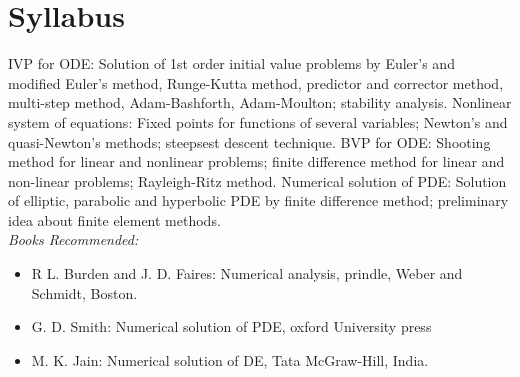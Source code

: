 \documentclass[../main-sheet.tex]{subfiles}
\begin{document}
\chapter*{Syllabus}
IVP for ODE: Solution of 1st order initial value problems by Euler's and modified Euler's method, Runge-Kutta method, predictor and corrector method, multi-step method, Adam-Bashforth, Adam-Moulton; stability analysis. Nonlinear system of equations: Fixed points for functions of several variables; Newton's and quasi-Newton's methods; steepsest descent technique. BVP for ODE: Shooting method for linear and nonlinear problems; finite difference method for linear and non-linear problems; Rayleigh-Ritz method. Numerical solution of PDE: Solution of elliptic, parabolic and hyperbolic PDE by finite difference method; preliminary idea about finite element methods.\\

\emph{Books Recommended:}
\begin{itemize}
    \item R L. Burden and J. D. Faires: Numerical analysis, prindle, Weber and Schmidt, Boston.
    \item G. D. Smith: Numerical solution of PDE, oxford University press
    \item M. K. Jain: Numerical solution of DE, Tata McGraw-Hill, India.
\end{itemize}
\end{document}
